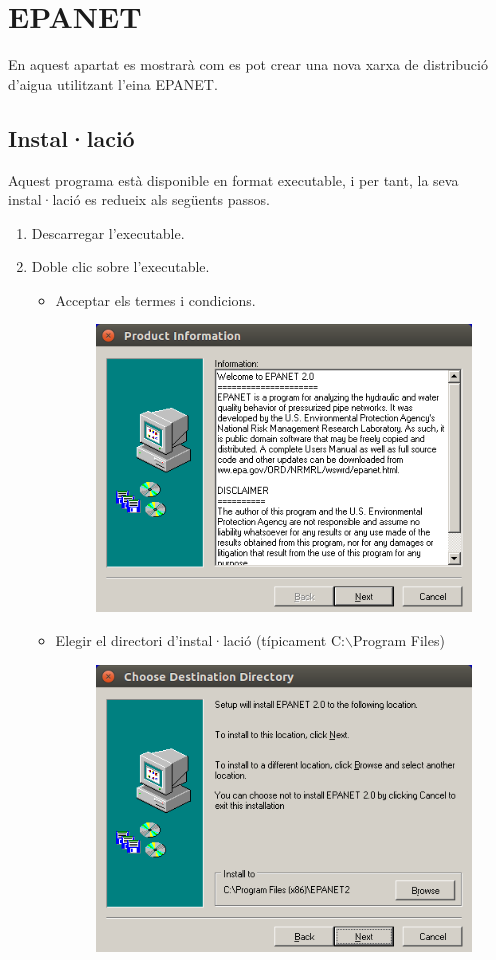 \documentclass[12pt]{article}
\begin{document}
\pagebreak
\clearpage
\section{EPANET}
En aquest apartat es mostrarà com es pot crear una nova xarxa de distribució d'aigua utilitzant l'eina EPANET.
\subsection{Instal·lació}
Aquest programa està disponible en format executable, i per tant, la seva instal·lació es redueix als següents passos.
\begin{enumerate}
	\item Descarregar l'executable.
	\item Doble clic sobre l'executable.
	\begin{itemize}
		\item Acceptar els termes i condicions.
		\begin{figure}[h!]
			\centering
			\includegraphics[scale=.3]{imatges/epanet/inst/1.png}
		\end{figure}
		\item Elegir el directori d'instal·lació (típicament C:$\backslash$Program Files)
		\begin{figure}[h!]
			\centering
			\includegraphics[scale=.3]{imatges/epanet/inst/2.png}

\end{figure}
\end{itemize}
\end{enumerate}
\end{document}
